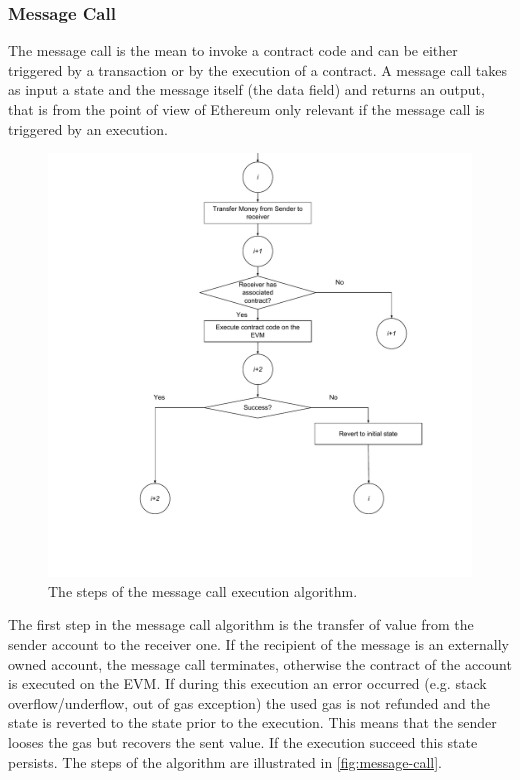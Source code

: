 \subsubsection{Message Call}
\label{sec:message-call}
The message call is the mean to invoke a contract code and can be either
triggered by a transaction or by the execution of a contract.
A message call takes as input a state and the message itself (the data field)
and returns an output, that is from the point of view of Ethereum only 
relevant if the message call is triggered by an execution.

\begin{figure}
	\begin{center}
		\includegraphics[width=\textwidth]{./res/img/message-call.pdf}
	\end{center}
	\caption{The steps of the message call execution algorithm.}
	\label{fig:message-call}
\end{figure}

The first step in the message call algorithm is the transfer of value from the
sender account to the receiver one. If the recipient of the message is
an externally owned account, the message call terminates, otherwise the contract
of the account is executed on the EVM. 
If during this execution an error occurred (e.g. stack overflow/underflow,
out of gas exception) the used gas is not refunded and the state is reverted 
to the state prior to the execution. This means that the sender
looses the gas but recovers the sent value. If the execution succeed this state
persists.
The steps of the algorithm are illustrated in \autoref{fig:message-call}.